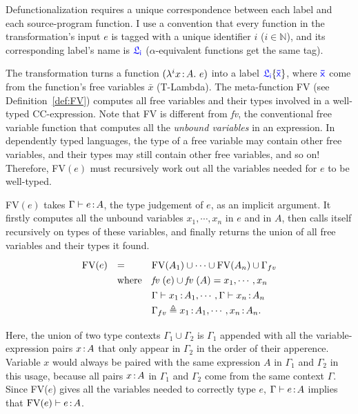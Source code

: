 Defunctionalization requires a unique correspondence between each label and each source-program function.
I use a convention that every function in the transformation's input $e$ is tagged with a unique identifier $i$ ($i \in \mathbb{N}$), and its corresponding label's name is $\target{\flabel_i}$ ($\alpha$-equivalent functions get the same tag).

The transformation turns a function $(\lambda^{i}x\hspace{0.5mm}{:}\hspace{0.5mm} A.\ e)$ into a label $\targetlab{\flabel_i}{\bar{x}}$, where $\target{\bar{x}}$ come from the function's free variables $\bar{x}$ (T-Lambda). The meta-function FV (see Definition~\ref{def:FV}) computes all free variables and their types involved in a well-typed CC-expression. Note that FV is different from \textit{fv}, the conventional free variable function that computes all the \textit{unbound variables} in an expression. In dependently typed languages, the type of a free variable may contain other free variables, and their types may still contain other free variables, and so on! Therefore, FV$(e)$ must recursively work out all the variables needed for $e$ to be well-typed. 

\begin{definition}FV$(e)$ takes $\Gamma \vdash e \hspace{0.5mm}{:}\hspace{0.5mm} A$, the type judgement of $e$, as an implicit argument. It firstly computes all the unbound variables $x_1, \cdots, x_n$ in $e$ and in $A$, then calls itself recursively on types of these variables, and finally returns the union of all free variables and their types it found. 
\begin{equation*}
\renewcommand{\arraystretch}{1.3}
\begin{array}{l l l}
	\text{FV}(e) & = & \text{FV}(A_1) \cup \cdots \cup \text{FV}(A_n) \cup \Gamma_{fv}\\
	& \text{where} & \textit{fv }(e) \cup \textit{fv }(A) = x_1, \cdots, x_n\\
	& & \Gamma \vdash x_1 \goodcolon A_1, \cdots, \Gamma \vdash x_n \goodcolon A_n\\
	& & \Gamma_{fv} \triangleq x_1 \goodcolon A_1, \cdots, x_n \goodcolon A_n.\\
\end{array}
\end{equation*}
\label{def:FV}
\end{definition}

Here, the union of two type contexts ${\Gamma_1} \cup {\Gamma_2}$ is ${\Gamma_1}$ appended with all the variable-expression pairs ${x} \hspace{0.5mm}{:}\hspace{0.5mm} {A}$ that only appear in ${\Gamma_2}$ in the order of their apperence. Variable $x$ would always be paired with the same expression $A$ in $\Gamma_1$ and $\Gamma_2$ in this usage, because all pairs $x \hspace{0.5mm}{:}\hspace{0.5mm} A$ in $\Gamma_1$ and $\Gamma_2$ come from the same context $\Gamma$. Since FV($e$) gives all the variables needed to correctly type $e$, $\Gamma \vdash e \hspace{0.5mm}{:}\hspace{0.5mm} A$ implies that $\text{FV}(e) \vdash e \hspace{0.5mm}{:}\hspace{0.5mm}	 A$.

